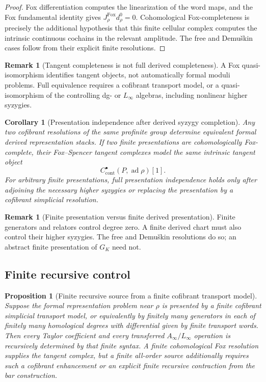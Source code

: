 \documentclass[11pt]{article}
\newtheorem{proposition}[theorem]{Proposition}
\newtheorem{corollary}[theorem]{Corollary}
\theoremstyle{definition}
\newtheorem{remark}[theorem]{Remark}
\begin{document}
\begin{proof}
Fox differentiation computes the linearization of the word maps, and the Fox fundamental identity gives $J^{\mathrm{Fox}}_\rho d^0_\rho=0$.  Cohomological Fox-completeness is precisely the additional hypothesis that this finite cellular complex computes the intrinsic continuous cochains in the relevant amplitude.  The free and Demu\v{s}kin cases follow from their explicit finite resolutions.
\end{proof}

\begin{remark}[Tangent completeness is not full derived completeness]\label{rem:tangent-vs-derived-complete}
A Fox quasi-isomorphism identifies tangent objects, not automatically formal moduli problems.  Full equivalence requires a cofibrant transport model, or a quasi-isomorphism of the controlling dg- or $L_\infty$ algebras, including nonlinear higher syzygies.
\end{remark}

\begin{corollary}[Presentation independence after derived syzygy completion]\label{cor:derived-presentation-independence}
Any two cofibrant resolutions of the same profinite group determine equivalent formal derived representation stacks.  If two finite presentations are cohomologically Fox-complete, their Fox--Spencer tangent complexes model the same intrinsic tangent object
\[
C^\bullet_{\mathrm{cont}}(P,\operatorname{ad}\rho)[1].
\]
For arbitrary finite presentations, full presentation independence holds only after adjoining the necessary higher syzygies or replacing the presentation by a cofibrant simplicial resolution.
\end{corollary}

\begin{remark}[Finite presentation versus finite derived presentation]\label{rem:finite-vs-derived-presentation}
Finite generators and relators control degree zero.  A finite derived chart must also control their higher syzygies.  The free and Demu\v{s}kin resolutions do so; an abstract finite presentation of $G_K$ need not.
\end{remark}

\subsection{Finite recursive control}

\begin{proposition}[Finite recursive source from a finite cofibrant transport model]\label{prop:finite-recursive-source}
Suppose the formal representation problem near $\rho$ is presented by a finite cofibrant simplicial transport model, or equivalently by finitely many generators in each of finitely many homological degrees with differential given by finite transport words.  Then every Taylor coefficient and every transferred $A_\infty/L_\infty$ operation is recursively determined by that finite syntax.  A finite cohomological Fox resolution supplies the tangent complex, but a finite all-order source additionally requires such a cofibrant enhancement or an explicit finite recursive contraction from the bar construction.
\end{proposition}
\end{document}
